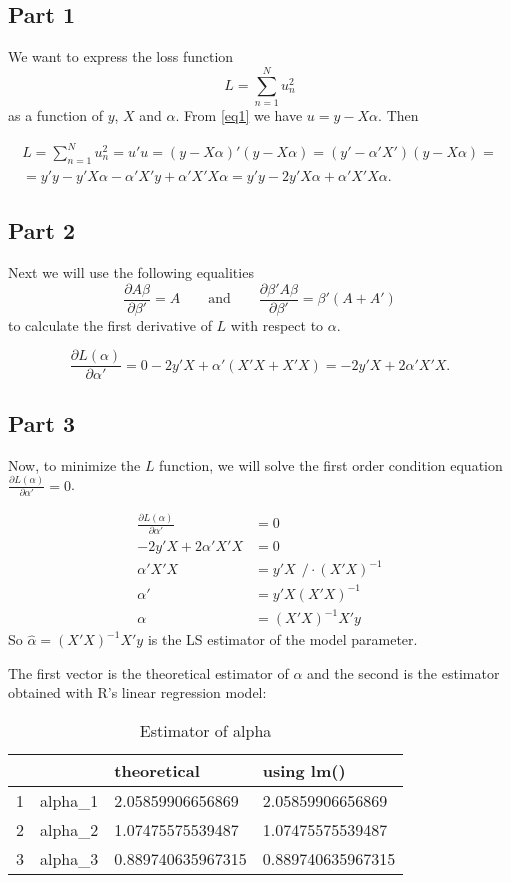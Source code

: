 \documentclass[12pt, a4paper]{article}\usepackage[]{graphicx}\usepackage[]{color}
\begin{document}
\subsection{Part 1}
We want to express the loss function 
\[ L = \sum_{n=1}^{N} u_n^2 \]
as a function of $y$, $X$ and $\alpha$. From \eqref{eq1} we have $u=y-X\alpha$. Then

\begin{gather*} 
L = \sum_{n=1}^{N} u_n^2 = u' u = (y-X\alpha)' (y-X\alpha) = (y'-\alpha' X')(y-X\alpha) = \\
= y'y - y'X\alpha - \alpha'X'y + \alpha'X'X\alpha = y'y - 2y'X\alpha + \alpha'X'X\alpha.
\end{gather*}


\subsection{Part 2}
Next we will use the following equalities
\[ \frac{\partial A\beta}{\partial \beta'} = A \qquad \text{and} \qquad  \frac{\partial \beta' A\beta}{\partial \beta'} = \beta'(A+A')\]
to calculate the first derivative of $L$ with respect to $\alpha$.

\[ \frac{\partial L(\alpha)}{\partial \alpha'} = 0 - 2y'X + \alpha'(X'X + X'X) = - 2y'X +2 \alpha'X'X. \]


\subsection{Part 3}
Now, to minimize the $L$ function, we will solve the first order condition equation $\frac{\partial L(\alpha)}{\partial \alpha'} = 0 $.

\begin{align*}
\frac{\partial L(\alpha)}{\partial \alpha'} & = 0 \\
-2 y'X + 2 \alpha'X'X  & = 0 \\
\alpha'X'X & = y'X \ \ /\cdot (X'X)^{-1} \\
\alpha' & = y'X (X'X)^{-1} \\
\alpha & = (X'X)^{-1} X'y
\end{align*}
So $\hat{\alpha}  = (X'X)^{-1} X'y$ is the LS estimator of the model parameter.

The first vector is the theoretical estimator of $\alpha$ and the second is the estimator obtained with R's linear regression model:
\begin{table}[H]
\centering
\begin{tabular}{rlll}
  \hline
 &   & theoretical & using lm() \\ 
  \hline
1 & alpha\_1 & 2.05859906656869 & 2.05859906656869 \\ 
  2 & alpha\_2 & 1.07475575539487 & 1.07475575539487 \\ 
  3 & alpha\_3 & 0.889740635967315 & 0.889740635967315 \\ 
   \hline
\end{tabular}
\caption{Estimator of alpha} 
\label{tab:alpha.est}
\end{table}
\end{document}
